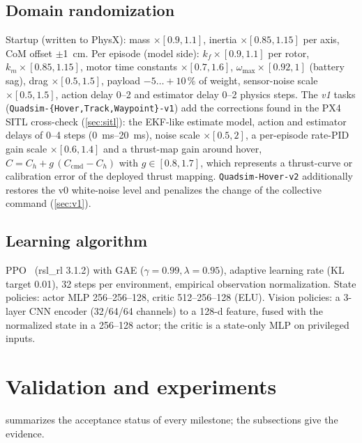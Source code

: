 \documentclass[11pt,a4paper]{article}
\begin{document}
\subsection{Domain randomization}\label{sec:dr}
Startup (written to PhysX): mass $\times[0.9,1.1]$, inertia $\times[0.85,1.15]$ per axis, CoM offset $\pm$\SI{1}{cm}.
Per episode (model side): $k_f\times[0.9,1.1]$ per rotor, $k_m\times[0.85,1.15]$, motor time constants
$\times[0.7,1.6]$, $\omega_{\max}\times[0.92,1]$ (battery sag), drag $\times[0.5,1.5]$, payload $-5\ldots+10\,\%$ of weight,
sensor-noise scale $\times[0.5,1.5]$, action delay 0--2 and estimator delay 0--2 physics steps.
The \emph{v1} tasks (\texttt{Quadsim-\{Hover,Track,Waypoint\}-v1}) add the corrections found in the PX4 SITL
cross-check (\cref{sec:sitl}): the EKF-like estimate model, action and estimator delays of 0--4 steps (\SIrange{0}{20}{ms}),
noise scale $\times[0.5,2]$, a per-episode rate-PID gain scale $\times[0.6,1.4]$ and a thrust-map gain around hover,
$C=C_h+g\,(C_{\mathrm{cmd}}-C_h)$ with $g\in[0.8,1.7]$, which represents a thrust-curve or calibration error of the
deployed thrust mapping. \texttt{Quadsim-Hover-v2} additionally restores the v0 white-noise level and penalizes the change
of the collective command (\cref{sec:v1}).

\subsection{Learning algorithm}
PPO~\cite{schulman2017ppo} (rsl\_rl 3.1.2) with GAE ($\gamma=0.99,\lambda=0.95$), adaptive learning rate (KL target
0.01), 32 steps per environment, empirical observation normalization. State policies: actor MLP 256--256--128,
critic 512--256--128 (ELU). Vision policies: a 3-layer CNN encoder (32/64/64 channels) to a 128-d feature, fused with
the normalized state in a 256--128 actor; the critic is a state-only MLP on privileged inputs.

\section{Validation and experiments}
 summarizes the acceptance status of every milestone; the subsections give the evidence.
\end{document}
